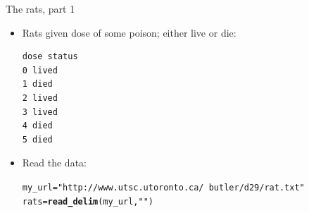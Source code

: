 \documentclass[unknownkeysallowed]{beamer}\usepackage[]{graphicx}\usepackage[]{color}
\makeatletter
\newcommand{\hlstr}[1]{\textcolor[rgb]{0.192,0.494,0.8}{#1}}%
\newcommand{\hlstd}[1]{\textcolor[rgb]{0.345,0.345,0.345}{#1}}%
\newcommand{\hlkwb}[1]{\textcolor[rgb]{0.69,0.353,0.396}{#1}}%
\newcommand{\hlkwd}[1]{\textcolor[rgb]{0.737,0.353,0.396}{\textbf{#1}}}%
\newenvironment{kframe}{%
 \def\at@end@of@kframe{}%
 \ifinner\ifhmode%
  \def\at@end@of@kframe{\end{minipage}}%
  \begin{minipage}{\columnwidth}%
 \fi\fi%
 \def\FrameCommand##1{\hskip\@totalleftmargin \hskip-\fboxsep
 \colorbox{shadecolor}{##1}\hskip-\fboxsep
     \hskip-\linewidth \hskip-\@totalleftmargin \hskip\columnwidth}%
 \MakeFramed {\advance\hsize-\width
   \@totalleftmargin\z@ \linewidth\hsize
   \@setminipage}}%
 {\par\unskip\endMakeFramed%
 \at@end@of@kframe}
\newenvironment{knitrout}{}{} %
\makeatother
\begin{document}
\begin{frame}[fragile]{The rats, part 1}

  \begin{itemize}
  \item Rats given dose of some poison; either live or die:

    \begin{small}
\begin{verbatim}
dose status
0 lived
1 died
2 lived
3 lived
4 died
5 died
\end{verbatim}
      
    \end{small}

  \item Read the data:

 
\begin{knitrout}\small
{}\color{fgcolor}\begin{kframe}
\begin{alltt}
\hlstd{my_url}\hlkwb{=}\hlstr{"http://www.utsc.utoronto.ca/~butler/d29/rat.txt"}
\hlstd{rats}\hlkwb{=}\hlkwd{read_delim}\hlstd{(my_url,}\hlstr{" "}\hlstd{)}
\end{alltt}


{\ttfamily\noindent\itshape\color{messagecolor}{\#\# Parsed with column specification:\\\#\# cols(\\\#\#\ \  dose = col\_integer(),\\\#\#\ \  status = col\_character()\\\#\# )}}\end{kframe}
\end{knitrout}
  

  \end{itemize}
  



\end{frame}
  
\end{document}
